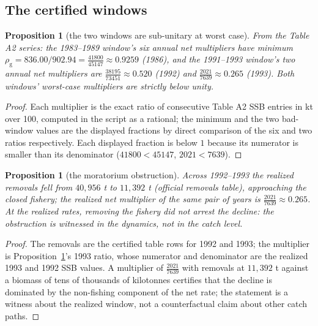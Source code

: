 \documentclass[10pt,twocolumn]{article}
\theoremstyle{plain}
\newtheorem{proposition}[theorem]{Proposition}
\theoremstyle{remark}
\begin{document}
\subsection{The certified windows}\label{windows}

\begin{proposition}[the two windows are sub-unitary at worst case]
\label{prop:windows}
From the Table A2 series: the 1983--1989 window's six annual net
multipliers have minimum \(\rho_{\mathrm{g}} = 836.00/902.94 =
\tfrac{41800}{45147} \approx 0.9259\) (1986), and the 1991--1993
window's two annual net multipliers are
\(\tfrac{38195}{73451} \approx 0.520\) (1992) and
\(\tfrac{2021}{7639} \approx 0.265\) (1993). Both windows' worst-case
multipliers are strictly below unity.
\end{proposition}

\begin{proof}
Each multiplier is the exact ratio of consecutive Table A2 SSB entries
in kt over 100, computed in the script as a rational; the minimum and
the two bad-window values are the displayed fractions by direct
comparison of the six and two ratios respectively. Each displayed
fraction is below \(1\) because its numerator is smaller than its
denominator (\(41800 < 45147\), \(2021 < 7639\)).
\end{proof}

\begin{proposition}[the moratorium obstruction]\label{prop:moratorium}
Across 1992--1993 the realized removals fell from \(40{,}956\) t to
\(11{,}392\) t (official removals table), approaching the closed
fishery; the realized net multiplier of the same pair of years is
\(\tfrac{2021}{7639} \approx 0.265\). At the realized rates, removing
the fishery did not arrest the decline: the obstruction is witnessed in
the dynamics, not in the catch level.
\end{proposition}

\begin{proof}
The removals are the certified table rows for 1992 and 1993; the
multiplier is Proposition~\ref{prop:windows}'s 1993 ratio, whose
numerator and denominator are the realized 1993 and 1992 SSB values. A
multiplier of \(\tfrac{2021}{7639}\) with removals at \(11{,}392\) t
against a biomass of tens of thousands of kilotonnes certifies that the
decline is dominated by the non-fishing component of the net rate; the
statement is a witness about the realized window, not a counterfactual
claim about other catch paths.
\end{proof}
\end{document}
